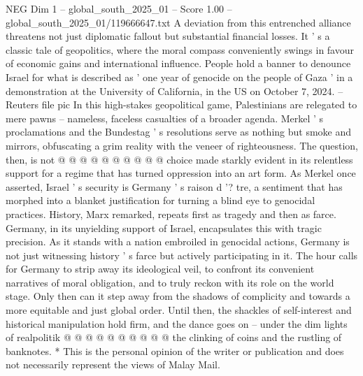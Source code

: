 \begin{textsample}{NEG Dim 1 – global\_south\_2025\_01 – Score 1.00 – global\_south\_2025\_01/119666647.txt}
A deviation from this entrenched alliance threatens not just diplomatic fallout but substantial financial losses.
It ' s a classic tale of geopolitics, where the moral compass conveniently swings in favour of economic gains and international influence.
People hold a banner to denounce Israel for what is described as ' one year of genocide on the people of Gaza ' in a demonstration at the University of California, in the US on October 7, 2024. -- Reuters file pic In this high-stakes geopolitical game, Palestinians are relegated to mere pawns -- nameless, faceless casualties of a broader agenda.
Merkel ' s proclamations and the Bundestag ' s resolutions serve as nothing but smoke and mirrors, obfuscating a grim reality with the veneer of righteousness.
The question, then, is not @ @ @ @ @ @ @ @ @ @ choice made starkly evident in its relentless support for a regime that has turned oppression into an art form.
As Merkel once asserted, Israel ' s security is Germany ' s raison d '? tre, a sentiment that has morphed into a blanket justification for turning a blind eye to genocidal practices.
History, Marx remarked, repeats first as tragedy and then as farce.
Germany, in its unyielding support of Israel, encapsulates this with tragic precision.
As it stands with a nation embroiled in genocidal actions, Germany is not just witnessing history ' s farce but actively participating in it.
The hour calls for Germany to strip away its ideological veil, to confront its convenient narratives of moral obligation, and to truly reckon with its role on the world stage.
Only then can it step away from the shadows of complicity and towards a more equitable and just global order.
Until then, the shackles of self-interest and historical manipulation hold firm, and the dance goes on -- under the dim lights of realpolitik @ @ @ @ @ @ @ @ @ @ the clinking of coins and the rustling of banknotes. * This is the personal opinion of the writer or publication and does not necessarily represent the views of Malay Mail.

\end{textsample}
